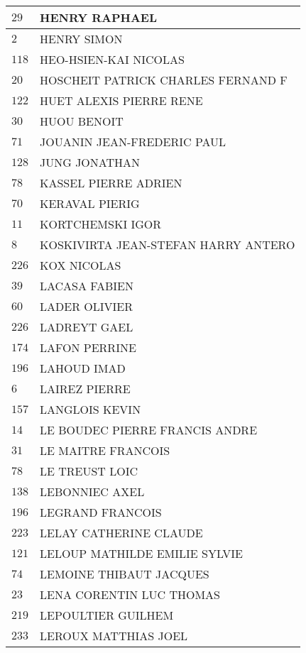 \begin{xltabular}{\linewidth}{|l|X|}
    \hline
    $29$ & HENRY RAPHAEL \\
    \hline
    $2$ & HENRY SIMON \\
    \hline
    $118$ & HEO-HSIEN-KAI NICOLAS \\
    \hline
    $20$ & HOSCHEIT PATRICK CHARLES FERNAND F \\
    \hline
    $122$ & HUET ALEXIS PIERRE RENE \\
    \hline
    $30$ & HUOU BENOIT \\
    \hline
    $71$ & JOUANIN JEAN-FREDERIC PAUL \\
    \hline
    $128$ & JUNG JONATHAN \\
    \hline
    $78$ & KASSEL PIERRE ADRIEN \\
    \hline
    $70$ & KERAVAL PIERIG \\
    \hline
    $11$ & KORTCHEMSKI IGOR \\
    \hline
    $8$ & KOSKIVIRTA JEAN-STEFAN HARRY ANTERO \\
    \hline
    $226$ & KOX NICOLAS \\
    \hline
    $39$ & LACASA FABIEN \\
    \hline
    $60$ & LADER OLIVIER \\
    \hline
    $226$ & LADREYT GAEL \\
    \hline
    $174$ & LAFON PERRINE \\
    \hline
    $196$ & LAHOUD IMAD \\
    \hline
    $6$ & LAIREZ PIERRE \\
    \hline
    $157$ & LANGLOIS KEVIN \\
    \hline
    $14$ & LE BOUDEC PIERRE FRANCIS ANDRE \\
    \hline
    $31$ & LE MAITRE FRANCOIS \\
    \hline
    $78$ & LE TREUST LOIC \\
    \hline
    $138$ & LEBONNIEC AXEL \\
    \hline
    $196$ & LEGRAND FRANCOIS \\
    \hline
    $223$ & LELAY CATHERINE CLAUDE \\
    \hline
    $121$ & LELOUP MATHILDE EMILIE SYLVIE \\
    \hline
    $74$ & LEMOINE THIBAUT JACQUES \\
    \hline
    $23$ & LENA CORENTIN LUC THOMAS \\
    \hline
    $219$ & LEPOULTIER GUILHEM \\
    \hline
    $233$ & LEROUX MATTHIAS JOEL \\

\end{xltabular}
